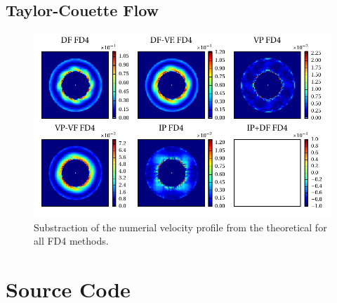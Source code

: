 \section{Taylor-Couette Flow}

\begin{figure}[!h]
  \includegraphics{gfx/immersed_boundary/tcflow/long/vz_profiles_o4.pdf}
  \caption{\label{tcflow:results_vprofiles_o4}
    Substraction of the numerial velocity profile from the theoretical
        for all FD4 methods.}
\end{figure}
\clearpage

\chapter{Source Code}

